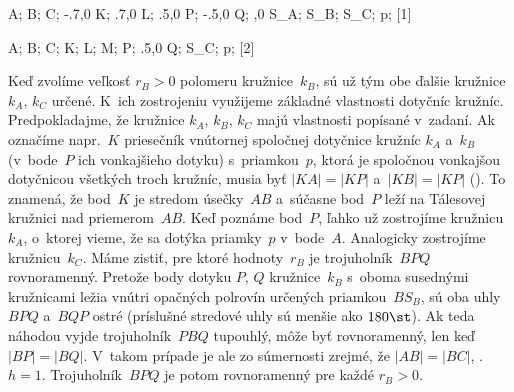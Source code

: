 {%
\fontplace
\tpoint A;
\tpoint B;
\tpoint C;
\tpoint\xy-.7,0 K;
\tpoint\xy.7,0 L;
\bpoint\xy.5,0 P;
\bpoint\xy-.5,0 Q;
\rBpoint{},0 S_{\!A};
\bpoint S_B;
\lBpoint S_C;
\lpoint p;
[1] \hfil\Obr

\fontplace
\tpoint A;
\tpoint B;
\tpoint C;
\tpoint K;
\tpoint L;
\rpoint M;
\rpoint P;
\bpoint\xy.5,0 Q;
\lBpoint S_C;
\rbpoint p;
[2] \hfil\Obr

Keď zvolíme veľkosť $r_B>0$ polomeru kružnice~$k_B$,
sú už tým obe ďalšie kružnice $k_A$, $k_C$ určené. K~ich
zostrojeniu využijeme základné vlastnosti dotyčníc kružníc.
Predpokladajme, že kružnice $k_A$, $k_B$, $k_C$ majú vlastnosti
popísané v~zadaní. Ak označíme napr.~$K$ priesečník vnútornej
spoločnej dotyčnice kružníc $k_A$ a~$k_B$ (v~bode~$P$ ich vonkajšieho
dotyku) s~priamkou~$p$, ktorá je spoločnou vonkajšou dotyčnicou všetkých
troch kružníc, musia byť $|KA| = |KP|$ a~$|KB| = |KP|$ (\obr). To
znamená, že bod~$K$ je stredom úsečky~$AB$ a~súčasne bod~$P$ leží
na Tálesovej kružnici nad priemerom~$AB$. Keď poznáme bod~$P$, ľahko
už zostrojíme kružnicu~$k_A$, o~ktorej vieme, že sa dotýka priamky~$p$
v~bode~$A$. Analogicky zostrojíme kružnicu~$k_C$.
\midinsert
\inspicture{}
\endinsert
Máme zistiť, pre ktoré hodnoty~$r_B$ je trojuholník~$BPQ$ rovnoramenný.
Pretože body dotyku $P$, $Q$ kružnice~$k_B$ s~oboma susednými
kružnicami ležia vnútri opačných polrovín určených priamkou~$BS_B$,
sú oba uhly $BPQ$ a~$BQP$ ostré (príslušné stredové uhly sú
menšie ako $180\st$). Ak teda náhodou vyjde trojuholník~$PBQ$ tupouhlý,
môže byť rovnoramenný, len keď $|BP|=|BQ|$. V~takom prípade je
ale zo súmernosti zrejmé, že $|AB|=|BC|$, \tj. $h=1$. Trojuholník~$BPQ$
je potom rovnoramenný pre každé $r_B>0$.

}
